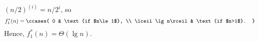 $(n/2)^{(i)}=n/2^i$, so
\[
    f_1^*(n) =
    \ccases{
        0 & \text{if $n\le1$}, \\
        \lceil\lg n\rceil & \text{if $n>1$}.
    }
\]
Hence, $f_1^*(n)=\Theta(\lg n)$.
